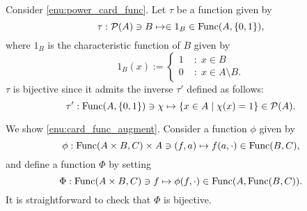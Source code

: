\documentclass[a4paper,12pt]{article}
\begin{document}
\begin{prf}
	Consider \ref{enu:power_card_func}.
	Let \( \tau \) be a function given by
	\begin{equation*}
		\tau: \mathcal{P}(A) \ni B \mapsto \in 1_{B} \in \mathrm{Func}(A,\left\{ 0,1 \right\}),
	\end{equation*}
	where \( 1_B \) is the characteristic function of \( B \) given by
	\begin{equation*}
		1_B(x):=\begin{cases}
			1 & \;\mathrm{:}\; x \in B              \\
			0 & \;\mathrm{:}\; x \in A \setminus B.
		\end{cases}
	\end{equation*}
	\( \tau \) is bijective since it admits the inverse
	\( \tau' \) defined as follows:
	\begin{equation*}
		\tau':\mathrm{Func}(A,\left\{ 0,1 \right\}) \ni \chi
		\mapsto
		\left\{  x \in A \;|\; \chi(x)=1\right\} \in \mathcal{P}(A).
	\end{equation*}
	
	We show \ref{enu:card_func_augment}.
	Consider a function \( \phi \) given by
	\begin{equation*}
		\phi : \mathrm{Func}(A\times B,C)\times A \ni (f,a)
		\mapsto
		f(a,\cdot) \in \mathrm{Func}(B,C),
	\end{equation*}
	and define a function \( \Phi \) by setting
	\begin{equation*}
		\Phi : \mathrm{Func}(A\times B,C) \ni f
		\mapsto \phi(f,\cdot) \in \mathrm{Func}(A,\mathrm{Func}(B,C)).
	\end{equation*}
	It is straightforward to check that \( \Phi \) is bijective.
	

\end{prf}
\end{document}
